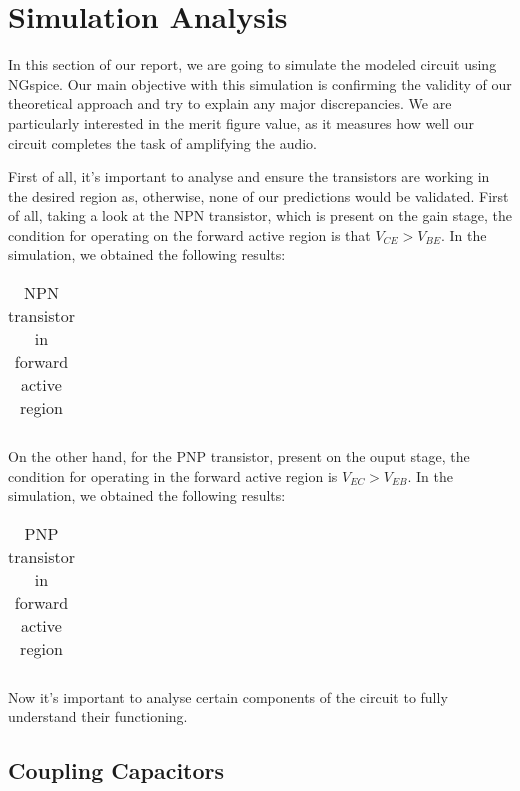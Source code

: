 \section{Simulation Analysis}
\label{simulanal}


In this section of our report, we are going to simulate the modeled circuit using NGspice. Our main objective with this simulation is confirming the validity of our theoretical approach and try to explain any major discrepancies. We are particularly interested in the merit figure value, as it measures how well our circuit completes the task of amplifying the audio. 

First of all, it's important to analyse and ensure the transistors are working in the desired region as, otherwise, none of our predictions would be validated.
First of all, taking a look at the NPN transistor, which is present on the gain stage, the condition for operating on the forward active region is that $V_{CE}>V_{BE}$. In the simulation, we obtained the following results:

\begin{table}[h]
\centering
\begin{tabularx}{0.6\textwidth} {
  | >{\raggedright\arraybackslash}X
  | >{\raggedleft\arraybackslash}X | }
 \hline

\end{tabularx}
\caption{NPN transistor in forward active region}
\end{table}

On the other hand, for the PNP transistor, present on the ouput stage, the condition for operating in the forward active region is $V_{EC}>V_{EB}$. In the simulation, we obtained the following results:

\begin{table}[H]
\centering
\begin{tabularx}{0.6\textwidth} {
  | >{\raggedright\arraybackslash}X
  | >{\raggedleft\arraybackslash}X | }
 \hline

\end{tabularx}
\caption{PNP transistor in forward active region}
\end{table}
Now it's important to analyse certain components of the circuit to fully understand their functioning.

\subsection{Coupling Capacitors}

\par 


